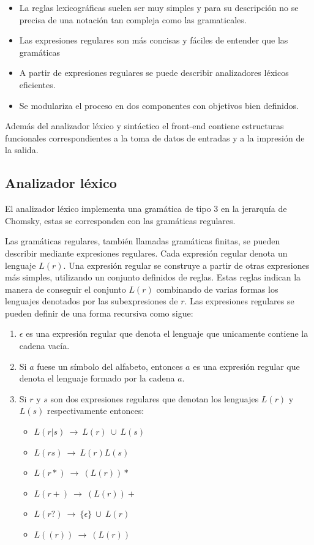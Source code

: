 \begin{itemize}
\item La reglas lexicográficas suelen ser muy simples y para su descripción no se precisa de una 
notación tan compleja como las gramaticales.
\item Las expresiones regulares son más concisas y fáciles de entender que las gramáticas
\item A partir de expresiones regulares se puede describir analizadores léxicos eficientes.
\item Se modulariza el proceso en dos componentes con objetivos bien definidos. 
\end{itemize}

Además del analizador léxico y sintáctico el front-end contiene estructuras funcionales correspondientes
a la toma de datos de entradas y a la impresión de la salida. 

\subsection {Analizador léxico}
El analizador léxico implementa una gramática de tipo 3 en la jerarquía de Chomsky, estas
se corresponden con las gramáticas regulares. 

Las gramáticas regulares, también llamadas gramáticas finitas, se pueden describir mediante expresiones regulares. 
Cada expresión regular denota un lenguaje $L(r)$. Una expresión regular se construye a partir de otras expresiones
más simples, utilizando un conjunto definidos de reglas. Estas reglas indican la manera de conseguir el conjunto 
$L(r)$ combinando de varias formas los lenguajes denotados por las subexpresiones de $r$. Las expresiones regulares
se pueden definir de una forma recursiva como sigue: 

\begin {enumerate}
\item $\epsilon$ es una expresión regular que denota el lenguaje que unicamente contiene la cadena vacía.
\item Si $a$ fuese un símbolo del alfabeto, entonces $a$ es una expresión regular que denota el lenguaje formado
por la cadena $a$.
\item Si $r$ y $s$ son dos expresiones regulares que denotan los lenguajes $L(r)$ y $L(s)$ respectivamente entonces:
\begin{itemize}
   \item $L(r|s)\ \rightarrow\ L(r)\ \cup\ L(s)$
   \item $L(rs) \ \rightarrow\ L(r)L(s)$
   \item $L(r*)\ \rightarrow\ (L(r))*$
   \item $L(r+)\ \rightarrow\ (L(r))+$
   \item $L(r?)\ \rightarrow\ \{\epsilon\}\ \cup\ L(r)$
   \item $L((r))\ \rightarrow\ (L(r))$
\end{itemize}
\end{enumerate}

